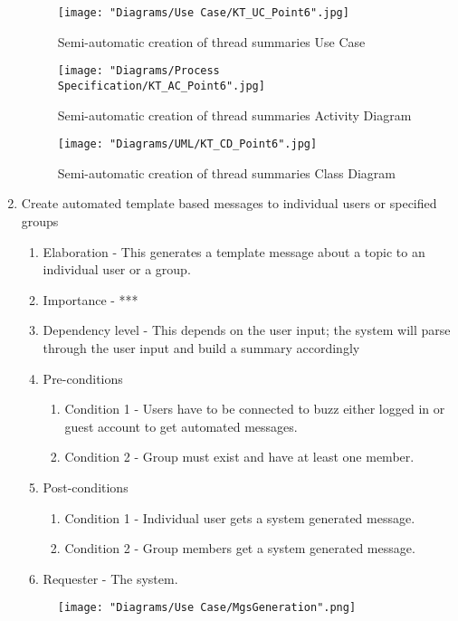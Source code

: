 \documentclass[12pt]{article}
\begin{document}
\begin{enumerate}
\begin{enumerate}
  \end{enumerate}
\begin{figure}[h]
	\centering
	\texttt{[image: "Diagrams/Use Case/KT\_UC\_Point6".jpg]}
	\caption{Semi-automatic creation of thread summaries Use Case}
\end{figure}
\begin{figure}[h]
	\centering
	\texttt{[image: "Diagrams/Process Specification/KT\_AC\_Point6".jpg]}
	\caption{Semi-automatic creation of thread summaries Activity Diagram}
\end{figure}
\begin{figure}[h]
	\centering
	\texttt{[image: "Diagrams/UML/KT\_CD\_Point6".jpg]}
	\caption{Semi-automatic creation of thread summaries Class Diagram}
\end{figure}
\clearpage %
   \item Create automated template based messages to individual users or specified groups   %
  \begin{enumerate}
    \item Elaboration - This generates a template message about a topic to an individual user or a group.
    \item Importance - ***
    \item Dependency level - This depends on the user input; the system will parse through the user input and build a summary accordingly
    \item Pre-conditions
    \begin{enumerate}
 		\item Condition 1 - Users have to be connected to buzz either logged in or guest account to get automated messages.
    	\item Condition 2 - Group must exist and have at least one member.
    \end{enumerate}
        \item Post-conditions
    \begin{enumerate}
    	\item Condition 1 - Individual user gets a system generated message.
    	\item Condition 2 - Group members get a system generated message.
    \end{enumerate}
    \item Requester - The system.
  \end{enumerate}
	\begin{figure}[h]
    	\centering
    	\texttt{[image: "Diagrams/Use Case/MgsGeneration".png]}

\end{figure}
\end{enumerate}
\end{document}
